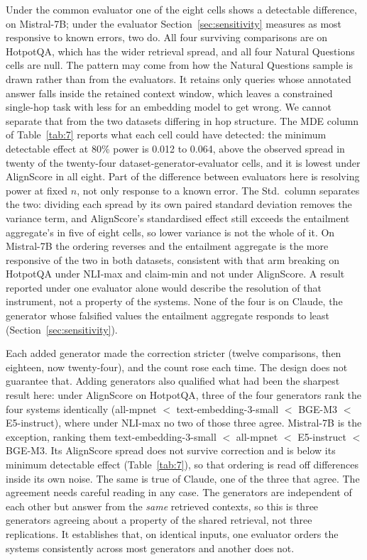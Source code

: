 \documentclass[11pt]{article}
\begin{document}
Under the common evaluator one of the eight cells shows a detectable difference, on Mistral-7B; under the evaluator Section~\ref{sec:sensitivity} measures as most responsive to known errors, two do. All four surviving comparisons are on HotpotQA, which has the wider retrieval spread, and all four Natural Questions cells are null. The pattern may come from how the Natural Questions sample is drawn rather than from the evaluators. It retains only queries whose annotated answer falls inside the retained context window, which leaves a constrained single-hop task with less for an embedding model to get wrong. We cannot separate that from the two datasets differing in hop structure. The MDE column of Table~\ref{tab:7} reports what each cell could have detected: the minimum detectable effect at 80\% power is 0.012 to 0.064, above the observed spread in twenty of the twenty-four dataset-generator-evaluator cells, and it is lowest under AlignScore in all eight. Part of the difference between evaluators here is resolving power at fixed $n$, not only response to a known error. The Std.\ column separates the two: dividing each spread by its own paired standard deviation removes the variance term, and AlignScore's standardised effect still exceeds the entailment aggregate's in five of eight cells, so lower variance is not the whole of it. On Mistral-7B the ordering reverses and the entailment aggregate is the more responsive of the two in both datasets, consistent with that arm breaking on HotpotQA under NLI-max and claim-min and not under AlignScore. A result reported under one evaluator alone would describe the resolution of that instrument, not a property of the systems. None of the four is on Claude, the generator whose falsified values the entailment aggregate responds to least (Section~\ref{sec:sensitivity}).

Each added generator made the correction stricter (twelve comparisons, then eighteen, now twenty-four), and the count rose each time. The design does not guarantee that. Adding generators also qualified what had been the sharpest result here: under AlignScore on HotpotQA, three of the four generators rank the four systems identically (all-mpnet $<$ text-embedding-3-small $<$ BGE-M3 $<$ E5-instruct), where under NLI-max no two of those three agree. Mistral-7B is the exception, ranking them text-embedding-3-small $<$ all-mpnet $<$ E5-instruct $<$ BGE-M3. Its AlignScore spread does not survive correction and is below its minimum detectable effect (Table~\ref{tab:7}), so that ordering is read off differences inside its own noise. The same is true of Claude, one of the three that agree. The agreement needs careful reading in any case. The generators are independent of each other but answer from the \emph{same} retrieved contexts, so this is three generators agreeing about a property of the shared retrieval, not three replications. It establishes that, on identical inputs, one evaluator orders the systems consistently across most generators and another does not.
\end{document}
